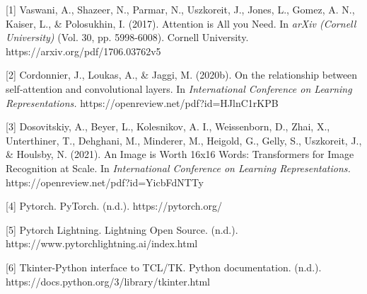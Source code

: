 \documentclass{article} %
\begin{document}
\small{
[1] Vaswani, A., Shazeer, N., Parmar, N., Uszkoreit, J., Jones, L., 
Gomez, A. N., Kaiser, L., \& Polosukhin, I. (2017). Attention is All 
you Need. In {\it arXiv (Cornell University)} (Vol. 30, pp. 5998-6008). 
Cornell University. https://arxiv.org/pdf/1706.03762v5

[2] Cordonnier, J., Loukas, A., \& Jaggi, M. (2020b). On the 
relationship between self-attention and convolutional layers. In {\it International 
Conference on Learning Representations.} https://openreview.net/pdf?id=HJlnC1rKPB

[3] Dosovitskiy, A., Beyer, L., Kolesnikov, A. I., Weissenborn, D., Zhai, X., 
Unterthiner, T., Dehghani, M., Minderer, M., Heigold, G., Gelly, S., Uszkoreit, 
J., \& Houlsby, N. (2021). An Image is Worth 16x16 Words: Transformers for Image 
Recognition at Scale. In {\it International Conference on Learning Representations.}
https://openreview.net/pdf?id=YicbFdNTTy

[4] Pytorch. PyTorch. (n.d.). https://pytorch.org/ 

[5] Pytorch Lightning. Lightning Open Source. (n.d.). https://www.pytorchlightning.ai/index.html 

[6] Tkinter-Python interface to TCL/TK. Python documentation. (n.d.). https://docs.python.org/3/library/tkinter.html 

}
\end{document}
